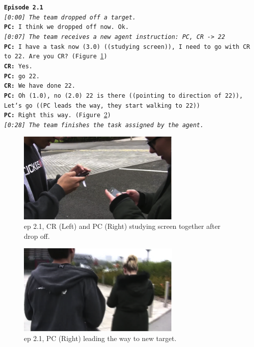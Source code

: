 \noindent\texttt{\textbf{Episode 2.1}\\
\emph{[0:00] The team dropped off a target.}\\
\textbf{PC:} I think we dropped off now. Ok. \\
\emph{ [0:07] The team receives a new agent instruction: PC, CR -> 22}\\
\textbf{PC:} I have a task now (3.0) ((studying screen)), I need to go with CR to 22. Are you CR? (Figure \ref{fig:study2ep11})\\
\textbf{CR:} Yes.\\
\textbf{PC:} go 22.\\
\textbf{CR:} We have done 22.\\
\textbf{PC:} Oh (1.0), no (2.0) 22 is there ((pointing to direction of 22)), Let`s go ((PC leads the way, they start walking to 22))\\
\textbf{PC:} Right this way. (Figure \ref{fig:study2ep12})\\
\emph{ [0:28] The team finishes the task assigned by the agent.}\\
}

\begin{figure}[ht]
\centering
 \includegraphics[width=0.7\textwidth]{img/study2/ep1/ep11}
\caption{ep 2.1, CR (Left) and PC (Right) studying screen together after drop off.}
\label{fig:study2ep11}
\end{figure}

\begin{figure}[ht]
\centering
 \includegraphics[width=0.7\textwidth]{img/study2/ep1/ep12}
\caption{ep 2.1, PC (Right) leading the way to new target.}
\label{fig:study2ep12}
\end{figure}


